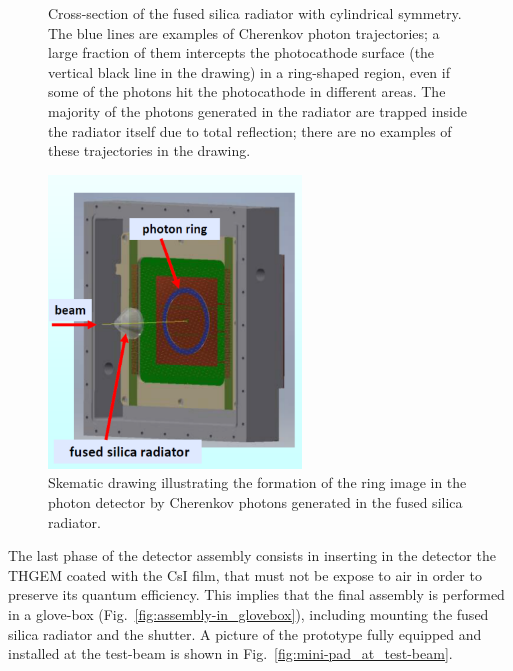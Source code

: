 \begin{enumerate}
\begin{figure}
\begin{center}
\caption{\label{fig:radiator}
Cross-section of the fused silica radiator with cylindrical symmetry. The blue lines are examples of Cherenkov photon trajectories; a large fraction of them intercepts the photocathode surface (the vertical black line in the drawing) in a ring-shaped region, even if some of the photons hit the photocathode in different areas. The majority of the photons generated in the radiator are trapped inside the radiator itself due to total reflection; there are no examples of these trajectories in the drawing.
}
			\end{center}
\end{figure}
\begin{figure}
			\begin{center}
\includegraphics[width=0.6\textwidth]{INFN_plots/hybrid&radiator}
\caption{\label{fig:hybrid&radiator}
Skematic drawing illustrating the formation of the ring image in the photon detector by Cherenkov photons generated in the fused silica radiator. 
}
			\end{center}
\end{figure}
The last phase of the detector assembly consists in inserting in the detector the THGEM coated with the CsI film, that must not be expose to air in order to preserve its quantum efficiency. This implies that the final assembly is performed in a glove-box (Fig.~\ref{fig:assembly-in_glovebox}), including mounting  the fused silica radiator and the shutter. A picture of the prototype fully equipped and installed at the test-beam is shown in Fig.~\ref{fig:mini-pad_at_test-beam}.                 %

\end{enumerate}
